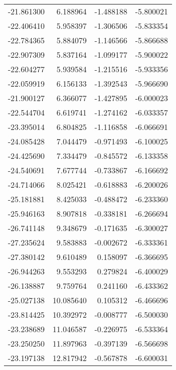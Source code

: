 \begin{tabular}{rrrr}
      -21.861300 &         6.188964 &   -1.488188 &  -5.800021 \\
      -22.406410 &         5.958397 &   -1.306506 &  -5.833354 \\
      -22.784365 &         5.884079 &   -1.146566 &  -5.866688 \\
      -22.907309 &         5.837164 &   -1.099177 &  -5.900022 \\
      -22.604277 &         5.939584 &   -1.215516 &  -5.933356 \\
      -22.059919 &         6.156133 &   -1.392543 &  -5.966690 \\
      -21.900127 &         6.366077 &   -1.427895 &  -6.000023 \\
      -22.544704 &         6.619741 &   -1.274162 &  -6.033357 \\
      -23.395014 &         6.804825 &   -1.116858 &  -6.066691 \\
      -24.085428 &         7.044479 &   -0.971493 &  -6.100025 \\
      -24.425690 &         7.334479 &   -0.845572 &  -6.133358 \\
      -24.540691 &         7.677744 &   -0.733867 &  -6.166692 \\
      -24.714066 &         8.025421 &   -0.618883 &  -6.200026 \\
      -25.181881 &         8.425033 &   -0.488472 &  -6.233360 \\
      -25.946163 &         8.907818 &   -0.338181 &  -6.266694 \\
      -26.741148 &         9.348679 &   -0.171635 &  -6.300027 \\
      -27.235624 &         9.583883 &   -0.002672 &  -6.333361 \\
      -27.380142 &         9.610489 &    0.158097 &  -6.366695 \\
      -26.944263 &         9.553293 &    0.279824 &  -6.400029 \\
      -26.138887 &         9.759764 &    0.241160 &  -6.433362 \\
      -25.027138 &        10.085640 &    0.105312 &  -6.466696 \\
      -23.814425 &        10.392972 &   -0.008777 &  -6.500030 \\
      -23.238689 &        11.046587 &   -0.226975 &  -6.533364 \\
      -23.250250 &        11.897963 &   -0.397139 &  -6.566698 \\
      -23.197138 &        12.817942 &   -0.567878 &  -6.600031 \\

\end{tabular}
